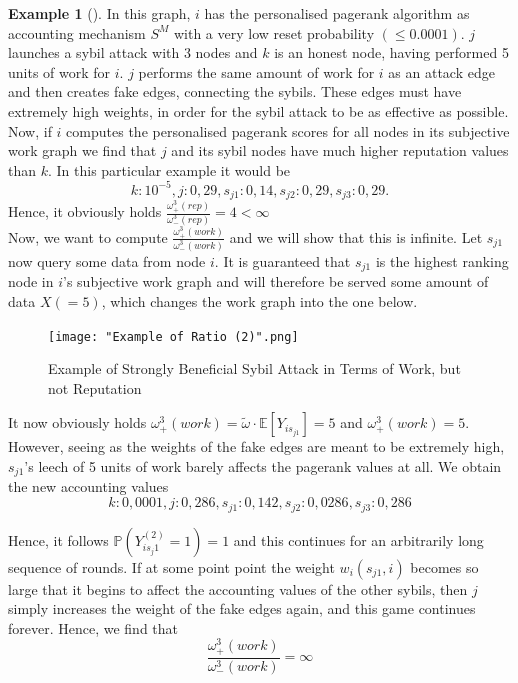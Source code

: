 \documentclass[11pt,a4paper]{report}
\theoremstyle{definition}
\theoremstyle{theorem}
\theoremstyle{proposition}
\theoremstyle{corollary}
\theoremstyle{lemma}
\theoremstyle{example}
\newtheorem{example}{Example}[section]
\theoremstyle{remark}
\begin{document}
\begin{example}[]
\noindent{}In this graph, $i$ has the personalised pagerank algorithm as accounting mechanism $S^M$ with a very low reset probability $(\leq{}0.0001)$. $j$ launches a sybil attack with 3 nodes and $k$ is an honest node, having performed 5 units of work for $i$. $j$ performs the same amount of work for $i$ as an attack edge and then creates fake edges, connecting the sybils. These edges must have extremely high weights, in order for the sybil attack to be as effective as possible. Now, if $i$ computes the personalised pagerank scores for all nodes in its subjective work graph we find that $j$ and its sybil nodes have much higher reputation values than $k$. In this particular example it would be 
\[
k:10^{-5}, j:0,29, s_{j1}:0,14, s_{j2}:0,29, s_{j3}:0,29.
\]
Hence, it obviously holds $\frac{\omega^3_{+}(rep)}{\omega^3_{-}(rep)} = 4 < \infty$ \vspace{1em}\\

\noindent{}Now, we want to compute $\frac{\omega^3_{+}(work)}{\omega^3_{-}(work)}$ and we will show that this is infinite. Let $s_{j1}$ now query some data from node $i$. It is guaranteed that $s_{j1}$ is the highest ranking node in $i$'s subjective work graph and will therefore be served some amount of data $X(=5)$, which changes the work graph into the one below. 

\begin{figure}[H]
\begin{center}
\texttt{[image: "Example of Ratio (2)".png]}
\caption{Example of Strongly Beneficial Sybil Attack in Terms of Work, but not Reputation}
\label{fig:Example of Strongly Beneficial Sybil Attack in Terms of Work, but not Reputation (2)}
\end{center}
\end{figure}

\noindent{}It now obviously holds $\omega^3_{+}(work) = \tilde{\omega}\cdot{}\mathbb{E}[Y_{is_{j1}}]=5$ and $\omega^3_{+}(work)=5$. However, seeing as the weights of the fake edges are meant to be extremely high, $s_{j1}$'s leech of 5 units of work barely affects the pagerank values at all. We obtain the new accounting values
\[
k:0,0001, j:0,286, s_{j1}:0,142, s_{j2}:0,0286, s_{j3}:0,286
\]

\noindent{}Hence, it follows $\mathbb{P}(Y^{(2)}_{is_j1}=1)=1$ and this continues for an arbitrarily long sequence of rounds. If at some point point the weight $w_i(s_{j1},i)$ becomes so large that it begins to affect the accounting values of the other sybils, then $j$ simply increases the weight of the fake edges again, and this game continues forever. Hence, we find that 
\[
\frac{\omega^3_{+}(work)}{\omega^3_{-}(work)}=\infty
\]
\end{example}
\end{document}
